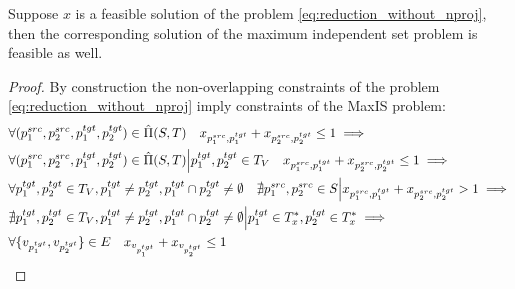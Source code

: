 \begin{lemma} \label{lemma:ilp_f_implies_maxis}
  Suppose \( x \) is a feasible solution of the problem \eqref{eq:reduction_without_nproj}, then
  the corresponding solution of the maximum independent set problem is feasible as well.
\end{lemma}
\begin{proof} By construction the non-overlapping constraints of the problem \eqref{eq:reduction_without_nproj}
  imply constraints of the MaxIS problem:
  \begin{align*}
    & \forall (p_1^{src}, p_2^{src}, p_1^{tgt}, p_2^{tgt}) \in \hat{\Pi}(S, T) \quad
    x_{p_1^{src}, p_1^{tgt}} + x_{p_2^{src}, p_2^{tgt}} \leq 1 \implies                                                     \\
    & \forall (p_1^{src}, p_2^{src}, p_1^{tgt}, p_2^{tgt}) \in \hat{\Pi}(S, T) \Big| p_1^{tgt}, p_2^{tgt} \in T_V \quad
    x_{p_1^{src}, p_1^{tgt}} + x_{p_2^{src}, p_2^{tgt}} \leq 1 \implies                                                     \\
    & \forall p_1^{tgt}, p_2^{tgt} \in T_V, p_1^{tgt} \neq p_2^{tgt}, p_1^{tgt} \cap p_2^{tgt} \neq \emptyset
    \quad \nexists p_1^{src}, p_2^{src} \in S \Big|
    x_{p_1^{src}, p_1^{tgt}} + x_{p_2^{src}, p_2^{tgt}} > 1 \implies                                                     \\
    & \nexists p_1^{tgt}, p_2^{tgt} \in T_V, p_1^{tgt} \neq p_2^{tgt}, p_1^{tgt} \cap p_2^{tgt} \neq \emptyset \Big|
    p_1^{tgt} \in T^*_x, p_2^{tgt} \in T^*_x \implies                                                                    \\
    & \forall \{ v_{p_1^{tgt}}, v_{p_2^{tgt}} \} \in E \quad x_{v_{p_1^{tgt}}} + x_{v_{p_2^{tgt}}}\leq 1
  \end{align*}
\end{proof}

